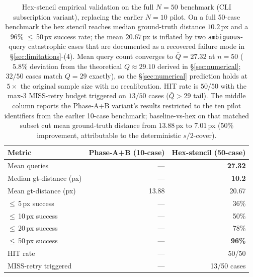 \documentclass[sigconf,nonacm]{acmart}
\begin{document}
\begin{table}[t]
\caption{Hex-stencil empirical validation on the full $N{=}50$
  benchmark (CLI subscription variant), replacing the earlier
  $N{=}10$ pilot.\protect\footnotemark{}  On a full 50-case
  benchmark the hex stencil reaches median ground-truth distance
  $10.2$\,px and a $96\%$ $\leq$\,50\,px success rate; the mean
  $20.67$\,px is inflated by two \texttt{ambiguous}-query
  catastrophic cases that are documented as a recovered failure
  mode in §\ref{sec:limitations}-(4).  Mean query count converges
  to $\bar{Q}=27.32$ at $n=50$ ($5.8\%$ deviation from the
  theoretical $Q\!\approx\!29.10$ derived in
  §\ref{sec:numerical}; $32/50$ cases match $Q=29$ exactly), so
  the §\ref{sec:numerical} prediction holds at $5\times$ the
  original sample size with no recalibration.  HIT rate is
  $50/50$ with the max-3 MISS-retry budget triggered on
  $13/50$ cases ($\bar{Q}>29$ tail).  The middle column reports the
  Phase-A+B variant's results restricted to the ten pilot
  identifiers from the earlier 10-case benchmark; baseline-vs-hex
  on that matched subset cut mean ground-truth distance from
  $13.88$\,px to $7.01$\,px ($50\%$ improvement, attributable to
  the deterministic $s/2$-cover).}
\label{tab:hex-stencil-50case}
\small
\begin{tabular}{@{}lrr@{}}
\toprule
\textbf{Metric}
  & \textbf{Phase-A+B (10-case)} & \textbf{Hex-stencil (50-case)} \\
\midrule
Mean queries                         & ---   & \textbf{27.32}        \\
Median gt-distance (px)              & ---   & \textbf{10.2}         \\
Mean gt-distance (px)                & 13.88 & 20.67                 \\
$\leq$\,5\,px success                & ---   & 36\%                  \\
$\leq$\,10\,px success               & ---   & 50\%                  \\
$\leq$\,20\,px success               & ---   & 78\%                  \\
$\leq$\,50\,px success               & ---   & \textbf{96\%}         \\
HIT rate                             & ---   & 50/50                 \\
MISS-retry triggered                 & ---   & 13/50 cases           \\
\bottomrule
\end{tabular}
\end{table}
\end{document}
